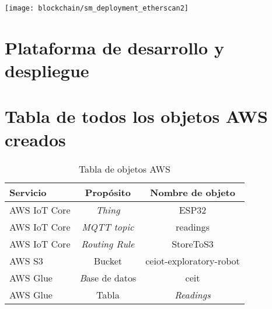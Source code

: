 \begin{center}
   \texttt{[image: blockchain/sm\_deployment\_etherscan2]}
   \label{fig:sm_deployment_etherscan2}
\end{center}


\section{Plataforma de desarrollo y despliegue}



\section{Tabla de todos los objetos AWS creados}




\begin{table}[h]
	\centering
	\caption[caption corto]{Tabla de objetos AWS}
	\begin{tabular}{l c c}    
		\toprule
		\textbf{Servicio} & \textbf{Propósito} & \textbf{Nombre de objeto}  \\
		\midrule
		AWS IoT Core & \textit{Thing} & ESP32 \\		
		AWS IoT Core & \textit{MQTT topic} & readings \\		
		AWS IoT Core & \textit{Routing Rule} & StoreToS3 \\		
		AWS S3 & Bucket & ceiot-exploratory-robot \\	
		AWS Glue & \textit Base de datos & ceit \\		
		AWS Glue & Tabla & \textit{Readings} \\		

		\bottomrule
		\hline
	\end{tabular}
	\label{tab:peces}
\end{table}

